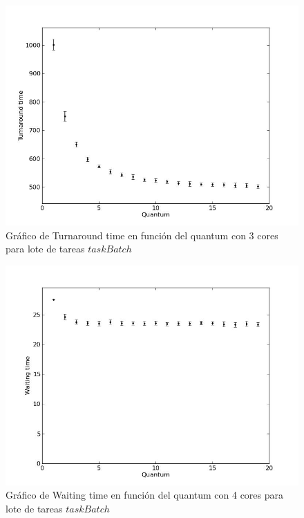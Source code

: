\begin{figure}[H]
	\begin{center}
		  \includegraphics[scale=0.3]{graficos/cores_3_ta.jpg}
		  \caption{Gráfico de Turnaround time en función del quantum con 3 cores para lote de tareas $taskBatch$}
		  \label{fig:contra1}
	\end{center}
\end{figure}

\begin{figure}[H]
	\begin{center}
		  \includegraphics[scale=0.3]{graficos/cores_4_wt.jpg}
		  \caption{Gráfico de Waiting time en función del quantum con 4 cores para lote de tareas $taskBatch$}
		  \label{fig:contra1}
	\end{center}
\end{figure}

